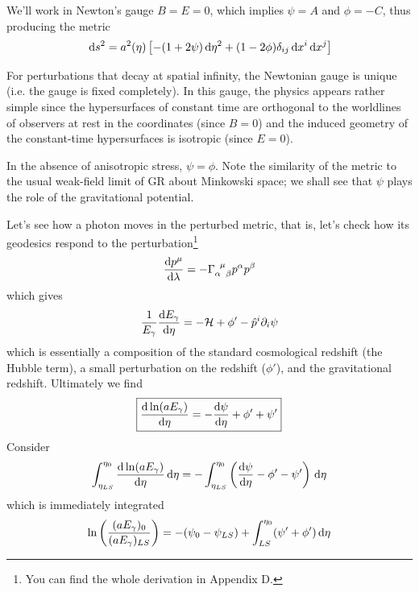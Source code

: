 \par We'll work in Newton's gauge $B=E=0$, which implies $\psi = A$ and $\phi = -C$, thus producing the metric
\begin{equation}
    \,\text{d}s^{2} = a^{2}(\eta)\left[-(1+2\psi)\,\text{d}\eta^{2} + (1-2\phi)\delta_{ij}\,\text{d}x^{i}\,\text{d}x^{j}\right]
    \label{eq:gauge-inv-fix-FLRW}
\end{equation}
\par For perturbations that decay at spatial infinity, the Newtonian gauge is unique (i.e. the gauge is fixed completely). In this gauge, the physics appears rather simple since the hypersurfaces of constant time are orthogonal to the worldlines of observers at rest in the coordinates (since $B = 0$) and the induced geometry of the constant-time hypersurfaces is isotropic (since $E = 0$).
\par In the absence of anisotropic stress, $\psi = \phi$. Note the similarity of the metric to the usual weak-field limit of GR about Minkowski space; we shall see that $\psi$ plays the role of the gravitational potential.
\par Let's see how a photon moves in the perturbed metric, that is, let's check how its geodesics respond to the perturbation\footnote{You can find the whole derivation in Appendix D.}
\begin{equation}
    \frac{\text{d}p^{\mu}}{\text{d}\lambda} = -\Gamma_{\alpha\;\;\beta}^{\;\;\mu}p^{\alpha}p^{\beta}
\end{equation}
which gives
\begin{equation}
    \frac{1}{E_{\gamma}}\frac{\text{d}E_{\gamma}}{\text{d}\eta} = -\mathcal{H} +\phi' -\hat{p}^{i}\partial_{i}\psi
\end{equation}
which is essentially a composition of the standard cosmological redshift (the Hubble term), a small perturbation on the redshift ($\phi'$), and the gravitational redshift. Ultimately we find
\begin{equation}
    \boxed{
        \frac{\text{d}\ln(aE_{\gamma})}{\text{d}\eta} = -\frac{\text{d}\psi}{\text{d}\eta} + \phi'+\psi'
    }
    \label{eq:cmbgeodesics}
\end{equation}
Consider 
\begin{equation}
    \int_{\eta_{LS}}^{\eta_{0}}\frac{\text{d}\ln(aE_{\gamma})}{\text{d}\eta}\,\text{d}\eta = -\int_{\eta_{LS}}^{\eta_{0}}\left(\frac{\text{d}\psi}{\text{d}\eta} - \phi'-\psi'\right)\,\text{d}\eta
\end{equation}
which is immediately integrated 
\begin{equation}
    \ln\left(\frac{(aE_{\gamma})_{0}}{(aE_{\gamma})_{LS}}\right) = -(\psi_{0}-\psi_{LS}) + \int_{LS}^{\eta_{0}}(\psi'+\phi')\,\text{d}\eta
\end{equation}

